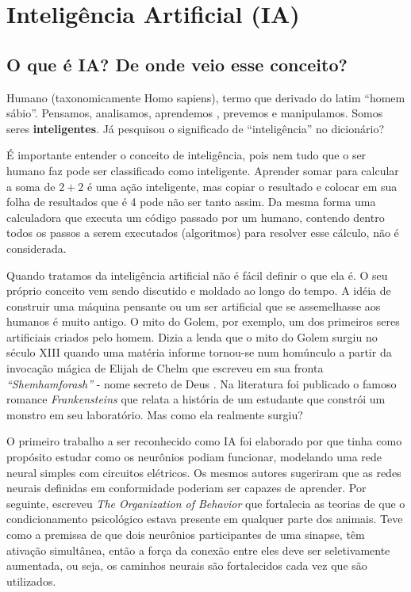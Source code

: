 \documentclass[
]{book}
\begin{document}
\hypertarget{i-a}{%
\chapter{Inteligência Artificial (IA)}\label{i-a}}

\hypertarget{o-que-uxe9-ia-de-onde-veio-esse-conceito}{%
\section{O que é IA? De onde veio esse conceito?}\label{o-que-uxe9-ia-de-onde-veio-esse-conceito}}

Humano (taxonomicamente Homo sapiens), termo que derivado do latim ``homem sábio''. Pensamos, analisamos, aprendemos , prevemos e manipulamos. Somos seres \textbf{inteligentes}. Já pesquisou o significado de ``inteligência'' no dicionário?

É importante entender o conceito de inteligência, pois nem tudo que o ser humano faz pode ser classificado como inteligente. Aprender somar para calcular a soma de \(2+2\) é uma ação inteligente, mas copiar o resultado e colocar em sua folha de resultados que é 4 pode não ser tanto assim. Da mesma forma uma calculadora que executa um código passado por um humano, contendo dentro todos os passos a serem executados (algoritmos) para resolver esse cálculo, não é considerada.

Quando tratamos da inteligência artificial não é fácil definir o que ela é. O seu próprio conceito vem sendo discutido e moldado ao longo do tempo. A idéia de construir uma máquina pensante ou um ser artificial que se assemelhasse aos humanos é muito antigo. O mito do Golem, por exemplo, um dos primeiros seres artificiais criados pelo homem. Dizia a lenda que o mito do Golem surgiu no século XIII quando uma matéria informe tornou-se num homúnculo a partir da invocação mágica de Elijah de Chelm que escreveu em sua fronta \emph{``Shemhamforash''} - nome secreto de Deus \citep{moser2006golem}. Na literatura foi publicado o famoso romance \emph{Frankensteins} \citep{shelley1818frankenstein} que relata a história de um estudante que constrói um monstro em seu laboratório. Mas como ela realmente surgiu?

O primeiro trabalho a ser reconhecido como IA foi elaborado por \citet{mcculloch1943logical} que tinha como propósito estudar como os neurônios podiam funcionar, modelando uma rede neural simples com circuitos elétricos. Os mesmos autores sugeriram que as redes neurais definidas em conformidade poderiam ser capazes de aprender. Por seguinte, \citet{hebb1949organization} escreveu \emph{The Organization of Behavior} que fortalecia as teorias de que o condicionamento psicológico estava presente em qualquer parte dos animais. Teve como a premissa de que dois neurônios participantes de uma sinapse, têm ativação simultânea, então a força da conexão entre eles deve ser seletivamente aumentada, ou seja, os caminhos neurais são fortalecidos cada vez que são utilizados.
\end{document}
